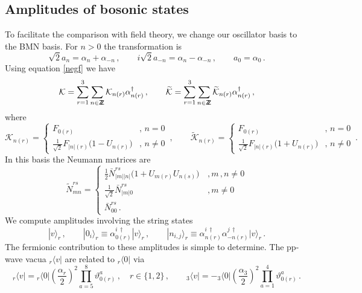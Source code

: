 \documentclass[12pt]{article}
\def\a{\alpha}
\def\vt{\vartheta}
\def\mc{\mathcal}
\def\la{\langle}
\def\ra{\rangle}
\def\dg{\dagger}
\def\wt{\widetilde}
\numberwithin{equation}{section} \setlength{\textwidth}{17cm}
\def\Zop{\bbbz}
\def\bbbz {{\sf Z\!\!Z}}
\begin{document}
\subsection{Amplitudes of bosonic states}\label{sec51}
To facilitate the comparison with field theory, we change our oscillator basis to the BMN basis.
For $n>0$ the transformation is
\begin{equation}
\sqrt{2}a_n=\a_n+\a_{-n}\,,\qquad i\sqrt{2}a_{-n}=\a_n-\a_{-n}\,,\qquad a_0=\a_0\,.
\end{equation}
Using equation \eqref{negf} we have 
\begin{equation}
{\mc K}=\sum_{r=1}^3\sum_{n\in\Zop}{\mc K}_{n(r)}\a_{n(r)}^{\dg}\,,\qquad
\wt{{\mc K}}=\sum_{r=1}^3\sum_{n\in\Zop}\wt{{\mc K}}_{n(r)}\a_{n(r)}^{\dg}\,,
\end{equation}
where
\begin{equation}
{\mc K}_{n(r)}=\begin{cases}
F_{0(r)} & ,\,n=0 \\ \frac{1}{\sqrt{2}}F_{|n|(r)}\bigl(1-U_{n(r)}\bigr) &,\,n\neq0
\end{cases}
\,,\qquad
\wt{{\mc K}}_{n(r)}=\begin{cases}
F_{0(r)} & ,\,n=0 \\ \frac{1}{\sqrt{2}}F_{|n|(r)}\bigl(1+U_{n(r)}\bigr) &,\,n\neq0
\end{cases}\,.
\end{equation}
In this basis the Neumann matrices are 
\begin{equation}
\wt{N}^{rs}_{mn}=
\begin{cases}
\frac{1}{2}\bar{N}^{rs}_{|m||n|}\bigl(1+U_{m(r)}U_{n(s)}\bigr) & \,,m\,,n\neq0 \\
\frac{1}{\sqrt{2}}\bar{N}^{rs}_{|m|0} & \,,m\neq0 \\
\bar{N}^{rs}_{00}\,.
\end{cases}
\end{equation}
\noindent We compute amplitudes involving the string states
\begin{equation}\label{bstates}
|v\ra_r\,,\qquad
|0_i\ra_r\equiv\a_{0(r)}^{i\,\dg}|v\ra_r\,,\qquad
|n_{i,j}\ra_r\equiv\a_{n(r)}^{i\,\dg}\a_{-n(r)}^{j\,\dg}|v\ra_r\,.
\end{equation}
The fermionic contribution to these amplitudes is simple to determine.
The pp-wave vacua ${}_r\la v|$ are related to ${}_r\la 0|$ via
\begin{equation}\label{vo}
{}_r\la v|={}_r\la 0|\left(\frac{\a_r}{2}\right)^2\prod_{a=5}^8\vt^a_{0(r)}\,,\quad r\in\{1,2\}\,,\qquad
{}_3\la v|=-{}_3\la 
0|\left(\frac{\a_3}{2}\right)^2\prod_{a=1}^4\vt^a_{0(r)}\,.
\end{equation}
\end{document}
